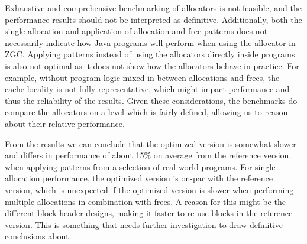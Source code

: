 






Exhaustive and comprehensive benchmarking of allocators is not feasible, and the performance results should not be interpreted as definitive. Additionally, both the single allocation and application of allocation and free patterns does not necessarily indicate how Java-programs will perform when using the allocator in ZGC. Applying patterns instead of using the allocators directly inside programs is also not optimal as it does not show how the allocators behave in practice. For example, without program logic mixed in between allocations and frees, the cache-locality is not fully representative, which might impact performance and thus the reliability of the results. Given these considerations, the benchmarks do compare the allocators on a level which is fairly defined, allowing us to reason about their relative performance. 

From the results we can conclude that the optimized version is somewhat slower and differs in performance of about 15\% on average from the reference version, when applying patterns from a selection of real-world programs. For single-allocation performance, the optimized version is on-par with the reference version, which is unexpected if the optimized version is slower when performing multiple allocations in combination with frees. A reason for this might be the different block header designs, making it faster to re-use blocks in the reference version. This is something that needs further investigation to draw definitive conclusions about.

